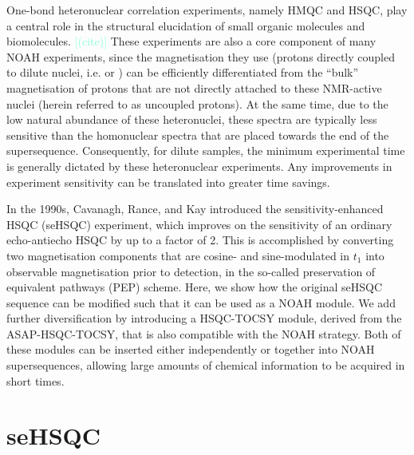 \documentclass[draft,11pt]{article}
\newcommand*{\carbon}{\ce{^{13}C}}
\newcommand*{\nitrogen}{\ce{^{15}N}}
\newcommand*{\hl}[1]{\textcolor{Aquamarine}{[#1]}}
\begin{document}
One-bond heteronuclear correlation experiments, namely HMQC and HSQC, play a central role in the structural elucidation of small organic molecules and biomolecules.
\hl{(cite)}
These experiments are also a core component of many NOAH experiments, since the magnetisation they use (protons directly coupled to dilute nuclei, i.e. \carbon{} or \nitrogen{}) can be efficiently differentiated from the ``bulk'' magnetisation of protons that are not directly attached to these NMR-active nuclei (herein referred to as uncoupled protons).\autocite{Garbow1982CPL, Kupce2019JMR}
At the same time, due to the low natural abundance of these heteronuclei, these spectra are typically less sensitive than the homonuclear spectra that are placed towards the end of the supersequence.
Consequently, for dilute samples, the minimum experimental time is generally dictated by these heteronuclear experiments.
Any improvements in experiment sensitivity can be translated into greater time savings.

In the 1990s, Cavanagh, Rance, and Kay introduced the sensitivity-enhanced HSQC (seHSQC) experiment, which improves on the sensitivity of an ordinary echo-antiecho HSQC by up to a factor of 2.\autocite{sehsqc}
This is accomplished by converting two magnetisation components that are cosine- and sine-modulated in $t_1$ into observable magnetisation prior to detection, in the so-called preservation of equivalent pathways (PEP) scheme.
Here, we show how the original seHSQC sequence can be modified such that it can be used as a NOAH module.
We add further diversification by introducing a HSQC-TOCSY module, derived from the ASAP-HSQC-TOCSY,\autocite{Becker2019JMR} that is also compatible with the NOAH strategy.
Both of these modules can be inserted either independently or together into NOAH supersequences, allowing large amounts of chemical information to be acquired in short times.

\section*{\texorpdfstring{\carbon{}}{13C} seHSQC}
\end{document}
